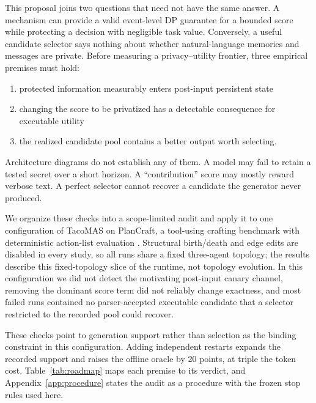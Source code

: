 \documentclass[11pt]{article}
\begin{document}
This proposal joins two questions that need not have the same answer. A mechanism can provide a valid event-level DP guarantee for a bounded score while protecting a decision with negligible task value. Conversely, a useful candidate selector says nothing about whether natural-language memories and messages are private. Before measuring a privacy--utility frontier, three empirical premises must hold:
\begin{enumerate}
    \setlength{\itemsep}{1pt}
    \item protected information measurably enters post-input persistent state
    \item changing the score to be privatized has a detectable consequence for executable utility
    \item the realized candidate pool contains a better output worth selecting.
\end{enumerate}
Architecture diagrams do not establish any of them. A model may fail to retain a tested secret over a short horizon. A ``contribution'' score may mostly reward verbose text. A perfect selector cannot recover a candidate the generator never produced.

We organize these checks into a scope-limited audit and apply it to one configuration of TacoMAS on PlanCraft, a tool-using crafting benchmark with deterministic action-list evaluation \citep{dagan2025plancraft}. Structural birth/death and edge edits are disabled in every study, so all runs share a fixed three-agent topology; the results describe this fixed-topology slice of the runtime, not topology evolution. In this configuration we did not detect the motivating post-input canary channel, removing the dominant score term did not reliably change exactness, and most failed runs contained no parser-accepted executable candidate that a selector restricted to the recorded pool could recover.

These checks point to generation support rather than selection as the binding constraint in this configuration. Adding independent restarts expands the recorded support and raises the offline oracle by 20 points, at triple the token cost. Table~\ref{tab:roadmap} maps each premise to its verdict, and Appendix~\ref{app:procedure} states the audit as a procedure with the frozen stop rules used here.
\end{document}
